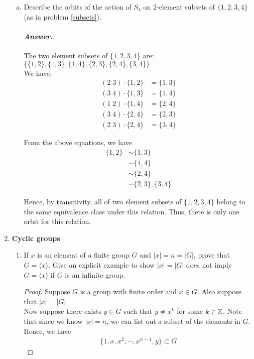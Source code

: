 \documentclass[11pt, reqno]{amsart}
\theoremstyle{plain}
\theoremstyle{definition}
\theoremstyle{example}
\newenvironment{ans}{\color{black}\medskip \paragraph*{\emph{Answer}.}}{\hfill \break  $~\!\!$ \dotfill \medskip }
\def\<{\langle} \def\>{\rangle}
\begin{document}
\begin{enumerate}[1.]
\begin{enumerate}[(a)]
\item Describe the orbits of the action of $S_4$ on $2$-element subsets of $\{1,2,3,4\}$ (as in problem \ref{subsets}).

\begin{ans}
The two element subsets of $\{1, 2, 3, 4\}$ are: $\{\{1, 2\}, \{1, 3\}, \{1, 4\}, \{2, 3\}, \{2, 4\}, \{3, 4\}\}$\\

We have,
\begin{align*}
(2 \; 3) \cdot \{1, 2\} &= \{1, 3\}\\
(3 \; 4) \cdot \{1, 3\} &= \{1, 4\}\\
(1 \; 2) \cdot \{1, 4\} &= \{2, 4\}\\
(3 \; 4) \cdot \{2, 4\} &= \{2, 3\}\\
(2 \; 3) \cdot \{2, 4\} &= \{3, 4\}
\end{align*}

From the above equations, we have
\begin{align*}
\{1, 2\} &\sim \{1, 3\}\\
&\sim \{1, 4\}\\
&\sim \{2, 4\}\\
&\sim \{2, 3\}, \{3, 4\}
\end{align*}

Hence, by transitivity, all of two element subsets of $\{1, 2, 3, 4\}$ belong to the same equivalence class under this relation. Thus, there is only one orbit for this relation.
\end{ans}

\end{enumerate}
\newpage
\item {\bf Cyclic groups}
\begin{enumerate}
\item If $x$ is an element of a finite group $G$ and $|x| = n = |G|$, prove that $G = \<x\>$. Give an explicit example to show $|x| = |G|$ does not imply $G = \<x\>$ if $G$ is an infinite group.

\begin{proof}
Suppose $G$ is a group with finite order and $x \in G$. Also suppose that $|x| = |G|$.\\

Now suppose there exists $y \in G$ such that $y \neq x^k$ for some $k \in \mathbb{Z}$. Note that since we know $|x| = n$, we can list out a subset of the elements in $G$. Hence, we have
\begin{align*}
\{1, x, x^2, \cdots, x^{n-1}, y\} \subset G
\end{align*}


\end{proof}
\end{enumerate}
\end{enumerate}
\end{document}
